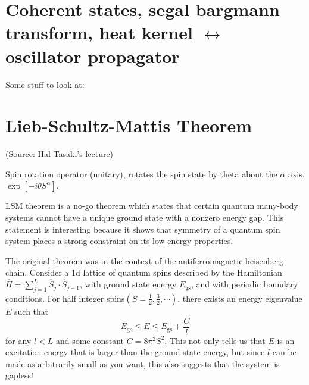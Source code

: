 \documentclass{article}
\begin{document}
\section{Coherent states, segal bargmann transform, heat kernel $\leftrightarrow$ oscillator propagator}
Some stuff to look at: \cite{PhysRevD.29.1107}

\section{Lieb-Schultz-Mattis Theorem}
(Source: Hal Tasaki's lecture)


Spin rotation operator (unitary), rotates the spin state by theta about the $\alpha$ axis.
$\exp{[-i\theta S^{\alpha}]}$.

LSM theorem is a no-go theorem which states that certain quantum many-body systems cannot have a unique ground state with a nonzero energy gap.
This statement is interesting because it shows that symmetry of a quantum spin system places a strong constraint on its low energy properties.

The original theorem was in the context of the antiferromagnetic heisenberg chain. Consider a 1d lattice of quantum spins described by the Hamiltonian
$\hat{H} = \sum^{L}_{j=1} \hat{S}_j \cdot \hat{S}_{j+1}$, with ground state energy $E_{\text{gs}}$, and with periodic boundary conditions.
For half integer spins$\left(S = \frac{1}{2}, \frac{3}{2}, \cdots\right)$, there exists an energy eigenvalue $E$ such that
\begin{equation}
    E_{\text{gs}} \leq E \leq E_{\text{gs}} + \frac{C}{l}
\end{equation}
for any $l<L$ and some constant $C = 8\pi^2S^2$. This not only tells us that $E$ is an excitation energy that is larger than the ground state energy, but since $l$ can be made as arbitrarily small as you want, this also suggests that the system is gapless!
\end{document}
